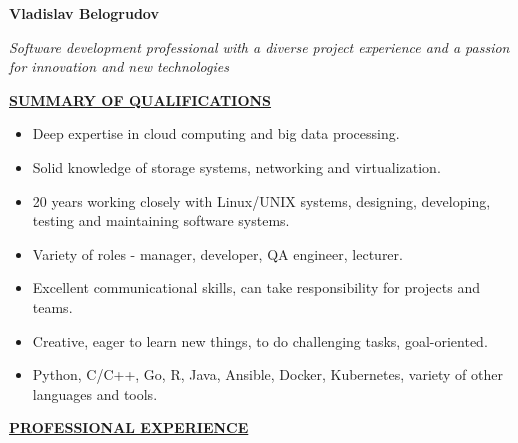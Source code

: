 \documentclass[a4paper,12pt,]{article}
\begin{document}
  \parbox{\textwidth} {
    \parbox[b]{140mm}{
      { \bfseries \LARGE Vladislav Belogrudov}
      \vspace{5ex}

      \large \em
      Software development professional with a diverse project experience and a passion for innovation and new technologies
      \vspace{6ex}
    }
    \hfill
  }

  \uline{ \bfseries{SUMMARY OF QUALIFICATIONS} }
  
  \begin{itemize}
    \item Deep expertise in cloud computing and big data processing.

    \item Solid knowledge of storage systems, networking and virtualization.

    \item 20 years working closely with Linux/UNIX systems,
      designing, developing, testing and maintaining software systems.
     
    \item Variety of roles - manager, developer, QA engineer, lecturer.

    \item Excellent communicational skills, can take responsibility for projects and teams.
      
    \item Creative, eager to learn new things, to do challenging tasks, goal-oriented.

    \item Python, C/C++, Go, R, Java, Ansible, Docker, Kubernetes, variety of other languages and tools.
  \end{itemize}
  
  \vspace{1ex}

  \uline{ \bfseries{PROFESSIONAL EXPERIENCE} }
\end{document}
